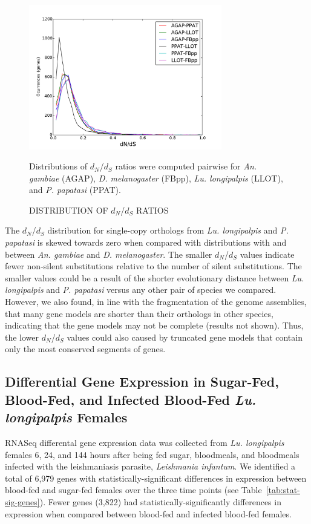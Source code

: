 \begin{figure}[H]
  \centering
  \caption{DISTRIBUTION OF $d_N$/$d_S$ RATIOS}
  \includegraphics[width=0.75\textwidth]{figures/ka_ks/dN_dS}
  \label{fig:dnds-distr}

  Distributions of $d_N$/$d_S$ ratios were computed pairwise for \emph{An. gambiae} (AGAP), \emph{D. melanogaster} (FBpp), \emph{Lu. longipalpis} (LLOT), and \emph{P. papatasi} (PPAT).
\end{figure}


The $d_N$/$d_S$ distribution for single-copy orthologs from \emph{Lu. longipalpis} and \emph{P. papatasi} is skewed towards zero when compared with distributions with and between \emph{An. gambiae} and \emph{D. melanogaster}.  The smaller $d_N$/$d_S$ values indicate fewer non-silent substitutions relative to the number of silent substitutions.  The smaller values could be a result of the shorter evolutionary distance between \emph{Lu. longipalpis} and \emph{P. papatasi} versus any other pair of species we compared.  However, we also found, in line with the fragmentation of the genome assemblies, that many gene models are shorter than their orthologs in other species, indicating that the gene models may not be complete (results not shown).  Thus, the lower $d_N$/$d_S$ values could also caused by truncated gene models that contain only the most conserved segments of genes.

\subsection{Differential Gene Expression in Sugar-Fed, Blood-Fed, and Infected Blood-Fed \emph{Lu. longipalpis} Females}
RNASeq differental gene expression data was collected from \emph{Lu. longipalpis} females 6, 24, and 144 hours after being fed sugar, bloodmeals, and bloodmeals infected with the leishmaniasis parasite, \emph{Leishmania infantum}.  We identified a total of 6,979 genes with statistically-significant differences in expression between blood-fed and sugar-fed females over the three time points (see Table~\ref{tab:stat-sig-genes}).  Fewer genes (3,822) had statistically-significantly differences in expression when compared between blood-fed and infected blood-fed females.

